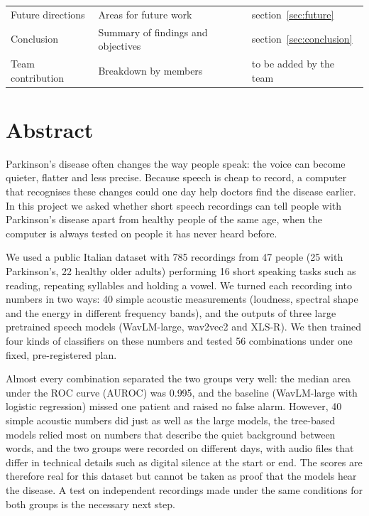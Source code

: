 \documentclass[11pt,a4paper]{article}
\begin{document}
\begin{center}
\begin{longtable}{>{\raggedright\arraybackslash}p{3.91cm}>{\raggedright\arraybackslash}p{8.40cm}>{\raggedright\arraybackslash}p{2.93cm}}
\hspace{0pt}Future directions & \hspace{0pt}Areas for future work & \hspace{0pt}section~\ref{sec:future}\\
\hspace{0pt}Conclusion & \hspace{0pt}Summary of findings and objectives & \hspace{0pt}section~\ref{sec:conclusion}\\
\hspace{0pt}Team contribution & \hspace{0pt}Breakdown by members & \hspace{0pt}to be added by the team\\
\end{longtable}\end{center}
\section{Abstract}\label{sec:abstract}
Parkinson's disease often changes the way people speak: the voice can become quieter, flatter and less precise. Because speech is cheap to record, a computer that recognises these changes could one day help doctors find the disease earlier. In this project we asked whether short speech recordings can tell people with Parkinson's disease apart from healthy people of the same age, when the computer is always tested on people it has never heard before.

We used a public Italian dataset with 785 recordings from 47 people (25 with Parkinson's, 22 healthy older adults) performing 16 short speaking tasks such as reading, repeating syllables and holding a vowel. We turned each recording into numbers in two ways: 40 simple acoustic measurements (loudness, spectral shape and the energy in different frequency bands), and the outputs of three large pretrained speech models (WavLM-large, wav2vec2 and XLS-R). We then trained four kinds of classifiers on these numbers and tested 56 combinations under one fixed, pre-registered plan.

Almost every combination separated the two groups very well: the median area under the ROC curve (AUROC) was 0.995, and the baseline (WavLM-large with logistic regression) missed one patient and raised no false alarm. However, 40 simple acoustic numbers did just as well as the large models, the tree-based models relied most on numbers that describe the quiet background between words, and the two groups were recorded on different days, with audio files that differ in technical details such as digital silence at the start or end. The scores are therefore real for this dataset but cannot be taken as proof that the models hear the disease. A test on independent recordings made under the same conditions for both groups is the necessary next step.
\end{document}
